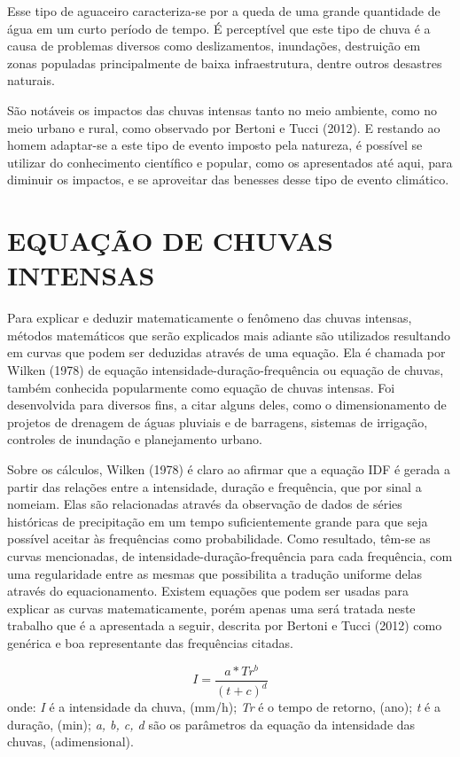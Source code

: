 Esse tipo de aguaceiro caracteriza-se por a queda de uma grande quantidade de água em um curto período de tempo. É perceptível que este tipo de chuva é a causa de problemas diversos como deslizamentos, inundações, destruição em zonas populadas principalmente de baixa infraestrutura, dentre outros desastres naturais.

São notáveis os impactos das chuvas intensas tanto no meio ambiente, como no meio urbano e rural, como observado por Bertoni e Tucci (2012). E restando ao homem adaptar-se a este tipo de evento imposto pela natureza, é possível se utilizar do conhecimento científico e popular, como os apresentados até aqui, para diminuir os impactos, e se aproveitar das benesses desse tipo de evento climático.

\section{EQUAÇÃO DE CHUVAS INTENSAS}

Para explicar e deduzir matematicamente o fenômeno das chuvas intensas, métodos matemáticos que serão explicados mais adiante são utilizados resultando em curvas que podem ser deduzidas através de uma equação. Ela é chamada por Wilken (1978) de equação intensidade-duração-frequência ou equação de chuvas, também conhecida popularmente como equação de chuvas intensas. Foi desenvolvida para diversos fins, a citar alguns deles, como o dimensionamento de projetos de drenagem de águas pluviais e de barragens, sistemas de irrigação, controles de inundação e planejamento urbano. 

Sobre os cálculos, Wilken (1978) é claro ao afirmar que a equação IDF é gerada a partir das relações entre a intensidade, duração e frequência, que por sinal a nomeiam. Elas são relacionadas através da observação de dados de séries históricas de precipitação em um tempo suficientemente grande para que seja possível aceitar às frequências como probabilidade.  Como resultado, têm-se as curvas mencionadas, de intensidade-duração-frequência para cada frequência, com uma regularidade entre as mesmas que possibilita a tradução uniforme delas através do equacionamento. Existem equações que podem ser usadas para explicar as curvas matematicamente, porém apenas uma será tratada neste trabalho que é a apresentada a seguir, descrita por Bertoni e Tucci (2012) como genérica e boa representante das frequências citadas.\bigskip

\newpage

\begin{equation}
I = \frac{a * Tr^b}{(t + c)^d}
\end{equation}
\newline
onde:
\newline
\textit{I} é a intensidade da chuva, (mm/h);
\newline
\textit{Tr} é o tempo de retorno, (ano);
\newline
\textit{t} é a duração, (min);
\newline
\textit{a, b, c, d}  são os parâmetros da equação da intensidade das chuvas, (adimensional).\bigskip

